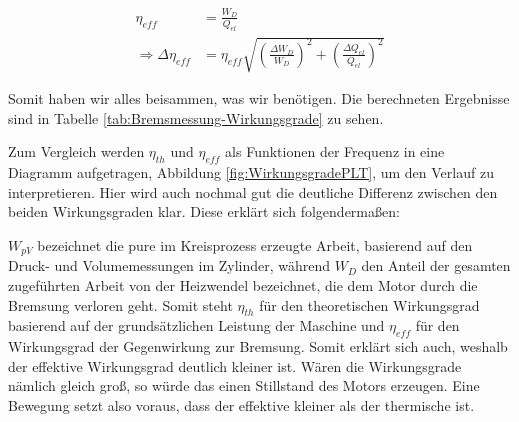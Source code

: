 \documentclass{article}
\begin{document}
\begin{equation}
    \begin{split}
        \eta_{eff} &= \frac{W_D}{Q_{el}} \\
        \Rightarrow \Delta \eta_{eff} &= \eta_{eff} \sqrt{\left( \frac{\Delta W_{D}}{W_{D}} \right)^2 + \left( \frac{\Delta Q_{el}}{Q_{el}} \right)^2}
    \end{split}
\end{equation}

Somit haben wir alles beisammen, was wir benötigen. Die berechneten Ergebnisse sind in Tabelle \ref{tab:Bremsmessung-Wirkungsgrade} zu sehen. 

\phantom{.}

\begin{table}[!h]
    \centering
    \caption{Berechnung der Wirkungsgrade $\eta_{th}$ \& $\eta_{eff}$}
    \label{tab:Bremsmessung-Wirkungsgrade}
\end{table}

\phantom{.}

Zum Vergleich werden $\eta_{th}$ und $\eta_{eff}$ als Funktionen der Frequenz in eine Diagramm aufgetragen, Abbildung \ref{fig:WirkungsgradePLT}, um den Verlauf zu interpretieren. Hier wird auch nochmal gut die deutliche Differenz zwischen den beiden Wirkungsgraden klar. Diese erklärt sich folgendermaßen:

$W_{pV}$ bezeichnet die pure im Kreisprozess erzeugte Arbeit, basierend auf den Druck- und Volumemessungen im Zylinder, während $W_D$ den Anteil der gesamten zugeführten Arbeit von der Heizwendel bezeichnet, die dem Motor durch die Bremsung verloren geht. Somit steht $\eta_{th}$ für den theoretischen Wirkungsgrad basierend auf der grundsätzlichen Leistung der Maschine und $\eta_{eff}$ für den Wirkungsgrad der Gegenwirkung zur Bremsung. Somit erklärt sich auch, weshalb der effektive Wirkungsgrad deutlich kleiner ist. Wären die Wirkungsgrade nämlich gleich groß, so würde das einen Stillstand des Motors erzeugen. Eine Bewegung setzt also voraus, dass der effektive kleiner als der thermische ist.
\end{document}
